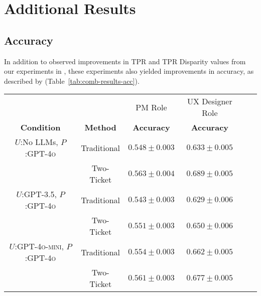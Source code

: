\newpage
\newpage
\appendix
\onecolumn


\section{Additional Results}
\subsection{Accuracy}
In addition to observed improvements in TPR and TPR Disparity values from our experiments in , these experiments also yielded improvements in accuracy, as described by (Table~\ref{tab:comb-results-acc}).
\begin{table*}[t]
    \centering
    \begin{tabular}{cccccc}
    \toprule
        && \multicolumn{1}{c}{PM Role} & \multicolumn{1}{c}{UX Designer Role} \\
        \textbf{Condition} & \textbf{Method} & \textbf{Accuracy} &   \textbf{Accuracy} \\
        \midrule
        $U$:No LLMs, $P$:\textsc{GPT-4o} & Traditional    &$0.548 \pm 0.003$  & $0.633 \pm 0.005$ \\
        & Two-Ticket     & $0.563 \pm 0.004$  & $ 0.689 \pm 0.005$   \\
        \midrule
        $U$:\textsc{GPT-3.5}, $P$:\textsc{GPT-4o} & Traditional    & $0.543 \pm 0.003$  & $ 0.629 \pm 0.006$  \\
        & Two-Ticket     & $0.551 \pm 0.003$  & $ 0.650 \pm 0.006$  \\
        \midrule
        $U$:\textsc{GPT-4o-mini}, $P$:\textsc{GPT-4o} & Traditional    & $0.554 \pm 0.003$  & $ 0.662 \pm 0.005$  \\
        & Two-Ticket     & $0.561 \pm 0.003$  & $ 0.677 \pm 0.005$   \\
        \bottomrule
    \end{tabular}
    \caption{Accuracy Results for Experiments conducted in . We see improvements in accuracy at the 95\% confidence interval.}
    \label{tab:comb-results-acc}
\end{table*}

